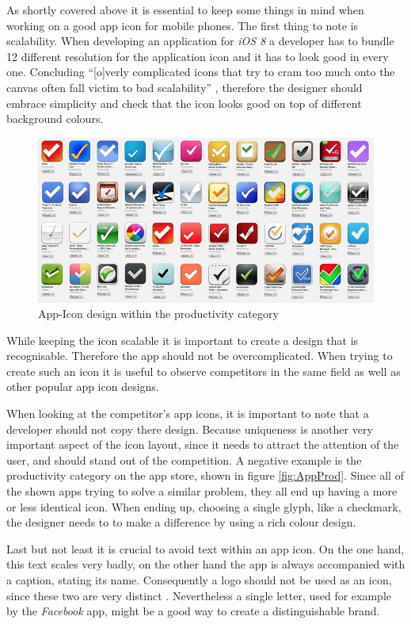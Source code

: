 As shortly covered above it is essential to keep some things in mind when working on a good app icon for mobile phones. The first thing to note is scalability. When developing an application for \emph{iOS 8} a developer has to bundle 12 different resolution for the application icon and it has to look good in every one. Concluding \enquote{[o]verly complicated icons that try to cram too much onto the canvas often fall victim to bad scalability} \cite{Flarup:2015aa}, therefore the designer should embrace simplicity and check that the icon looks good on top of different background colours. \cite{Flarup:2015aa}

\begin{figure}[h]
  	\centering
  	\includegraphics[width=0.7\linewidth]{./images/productivity-icons.png}
  	\caption[App-Icon design within the productivity category, retrieved from \cite{Flarup:2015aa}]{App-Icon design within the productivity category}
	\label{fig:AppProd}
\end{figure}
\nocite{Flarup:2015aa}

While keeping the icon scalable it is important to create a design that is recognisable. Therefore the app should not be overcomplicated. When trying to create such an icon it is useful to observe competitors in the same field as well as other popular app icon designs. \cite{Flarup:2015aa}

When looking at the competitor's app icons, it is important to note that a developer should not copy there design. Because uniqueness is another very important aspect of the icon layout, since it needs to attract the attention of the user, and should stand out of the competition. A negative example is the productivity category on the app store, shown in figure \vref{fig:AppProd}. Since all of the shown apps trying to solve a similar problem, they all end up having a more or less identical icon. When ending up, choosing a single glyph, like a checkmark, the designer needs to to make a difference by using a rich colour design. \cite{Flarup:2015aa}

Last but not least it is crucial to avoid text within an app icon. On the one hand, this text scales very badly, on the other hand the app is always accompanied with a caption, stating its name. Consequently a logo should not be used as an icon, since these two are very distinct \cite{Flarup:2015ab}. Nevertheless a single letter, used for example by the \emph{Facebook} app, might be a good way to create a distinguishable brand.

